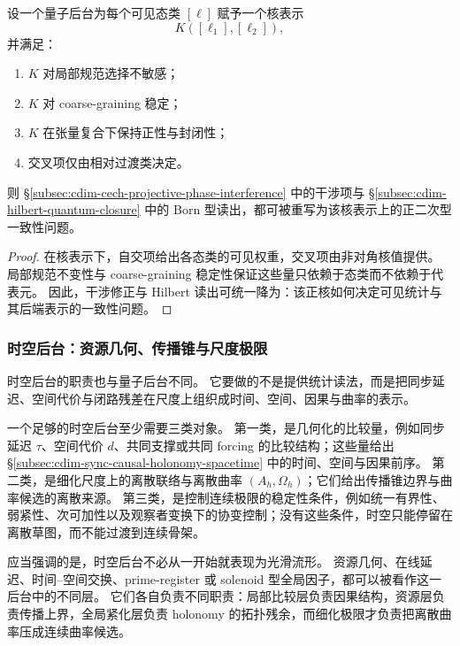 \begin{proposition}[核化充分模板]\label{prop:physical-spacetime-kernelization-template}
设一个量子后台为每个可见态类 \([\ell]\) 赋予一个核表示
\[
K([\ell_1],[\ell_2]),
\]
并满足：
\begin{enumerate}
  \item \(K\) 对局部规范选择不敏感；
  \item \(K\) 对 coarse-graining 稳定；
  \item \(K\) 在张量复合下保持正性与封闭性；
  \item 交叉项仅由相对过渡类决定。
\end{enumerate}
则 \S\ref{subsec:cdim-cech-projective-phase-interference} 中的干涉项与 \S\ref{subsec:cdim-hilbert-quantum-closure} 中的 Born 型读出，都可被重写为该核表示上的正二次型一致性问题。
\end{proposition}
\begin{proof}
在核表示下，自交项给出各态类的可见权重，交叉项由非对角核值提供。
局部规范不变性与 coarse-graining 稳定性保证这些量只依赖于态类而不依赖于代表元。
因此，干涉修正与 Hilbert 读出可统一降为：该正核如何决定可见统计与其后端表示的一致性问题。
\end{proof}

\subsubsection{时空后台：资源几何、传播锥与尺度极限}
时空后台的职责也与量子后台不同。
它要做的不是提供统计读法，而是把同步延迟、空间代价与闭路残差在尺度上组织成时间、空间、因果与曲率的表示。

一个足够的时空后台至少需要三类对象。
第一类，是几何化的比较量，例如同步延迟 \(\tau\)、空间代价 \(d\)、共同支撑或共同 forcing 的比较结构；这些量给出 \S\ref{subsec:cdim-sync-causal-holonomy-spacetime} 中的时间、空间与因果前序。
第二类，是细化尺度上的离散联络与离散曲率 \((A_h,\Omega_h)\)；它们给出传播锥边界与曲率候选的离散来源。
第三类，是控制连续极限的稳定性条件，例如统一有界性、弱紧性、次可加性以及观察者变换下的协变控制；没有这些条件，时空只能停留在离散草图，而不能过渡到连续骨架。

应当强调的是，时空后台不必从一开始就表现为光滑流形。
资源几何、在线延迟、时间--空间交换、prime-register 或 solenoid 型全局因子，都可以被看作这一后台中的不同层。
它们各自负责不同职责：局部比较层负责因果结构，资源层负责传播上界，全局紧化层负责 holonomy 的拓扑残余，而细化极限才负责把离散曲率压成连续曲率候选。

